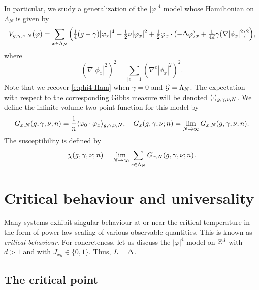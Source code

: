 In particular, we study a generalization of the $|\varphi|^4$ model whose Hamiltonian
on $\Lambda_N$ is given by
\begin{equation}
\label{e:Vdef1}
V_{g,\gamma,\nu,N}(\varphi)
	=
\sum_{x\in\Lambda_N}
\Big(
	\tfrac{1}{4} (g - \gamma) |\varphi_x|^4
		+
	\tfrac{1}{2} \nu |\varphi_x|^2
		+
	\tfrac{1}{2} \varphi_x \cdot (-\Delta \varphi)_x
		+
	\tfrac{1}{4 d} \gamma (\nabla |\phi_x|^2)^2
\Big),
\end{equation}
where
\begin{equation}
(\nabla |\phi_x|^2)^2
	=
\sum_{|e|=1} (\nabla^e |\phi_x|^2)^2.
\end{equation}
Note that we recover \eqref{e:phi4-Ham} when $\gamma = 0$ and $\mathcal{G} = \Lambda_N$.
The expectation with respect to the corresponding Gibbs measure will
be denoted $\langle\cdot\rangle_{g,\gamma,\nu,N}$.
We define the infinite-volume two-point function for this model by
\begin{equation}
\label{e:two-point-function-phi4}
G_{x, N}(g,\gamma,\nu; n)
	=
\frac{1}{n} \langle \varphi_0 \cdot \varphi_x \rangle_{g,\gamma,\nu,N},
	\quad
G_x(g,\gamma,\nu; n)
	=
\lim_{N \rightarrow \infty} G_{x, N}(g,\gamma,\nu; n).
\end{equation}
The susceptibility is defined by
\begin{equation}
\label{e:susceptibility-def}
\chi(g, \gamma, \nu; n)
	=
\lim_{N\rightarrow\infty} \sum_{x\in\Lambda_N} G_{x,N}(g, \gamma, \nu; n).
\end{equation}


\section{Critical behaviour and universality}

Many systems exhibit singular behaviour at or near the critical temperature in
the form of power law scaling of various observable quantities. This is known as
\emph{critical behaviour}. For concreteness, let us discuss the $|\varphi|^4$ model
on ${ {{\mathbb Z}}^d }$ with $d > 1$ and with $J_{xy} \in \{ 0, 1 \}$. Thus, $L = \Delta$.

\subsection{The critical point}

